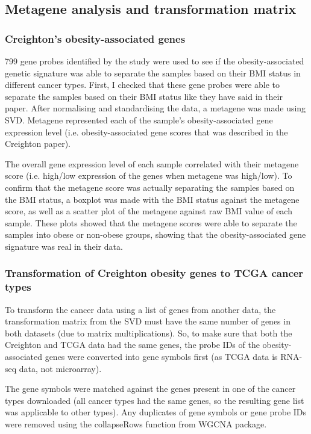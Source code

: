 \documentclass[a4paper, 11pt]{article}
\begin{document}
\subsection*{Metagene analysis and transformation matrix}

\subsubsection*{Creighton's obesity-associated genes}

799 gene probes identified by the study were used to see if the obesity-associated genetic signature was able to separate the samples based on their BMI status in different cancer types.
First, I checked that these gene probes were able to separate the samples based on their BMI status like they have said in their paper.
After normalising and standardising the data, a metagene  was made using SVD.
Metagene represented each of the sample's obesity-associated gene expression level (i.e. obesity-associated gene scores that was described in the Creighton paper).

The overall gene expression level of each sample correlated with their metagene score (i.e. high/low expression of the genes when metagene was high/low).
To confirm that the metagene score was actually separating the samples based on the BMI status, a boxplot was made with the BMI status against the metagene score, as well as a scatter plot of the metagene against raw BMI value of each sample.
These plots showed that the metagene scores were able to separate the samples into obese or non-obese groups, showing that the obesity-associated gene signature was real in their data.

\subsubsection*{Transformation of Creighton obesity genes to TCGA cancer types}

To transform the cancer data using a list of genes from another data, the transformation matrix from the SVD must have the same number of genes in both datasets (due to matrix multiplications).
So, to make sure that both the Creighton and TCGA data had the same genes, the probe IDs of the obesity-associated genes were converted into gene symbols first (as TCGA data is RNA-seq data, not microarray).

The gene symbols were matched against the genes present in one of the cancer types downloaded (all cancer types had the same genes, so the resulting gene list was applicable to other types).
Any duplicates of gene symbols or gene probe IDs  were removed using the collapseRows function from WGCNA package.
\end{document}
